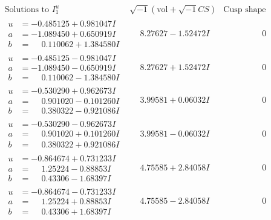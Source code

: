 \documentclass[1p]{elsarticle_modified}
\theoremstyle{definition}
\newcommand{\I}{\sqrt{-1}}
\begin{document}
$$\begin{array}{c|c|c}  
\text{Solutions to }I^u_{1}& \I (\text{vol} + \sqrt{-1}CS) & \text{Cusp shape}\\
 \hline 
\begin{aligned}
u &= -0.485125 + 0.981047 I \\
a &= -1.089450 + 0.650919 I \\
b &= \phantom{-}0.110062 + 1.384580 I\end{aligned}
 & \phantom{-}8.27627 - 1.52472 I & \phantom{-0.000000 } 0 \\ \hline\begin{aligned}
u &= -0.485125 - 0.981047 I \\
a &= -1.089450 - 0.650919 I \\
b &= \phantom{-}0.110062 - 1.384580 I\end{aligned}
 & \phantom{-}8.27627 + 1.52472 I & \phantom{-0.000000 } 0 \\ \hline\begin{aligned}
u &= -0.530290 + 0.962673 I \\
a &= \phantom{-}0.901020 - 0.101260 I \\
b &= \phantom{-}0.380322 - 0.921086 I\end{aligned}
 & \phantom{-}3.99581 + 0.06032 I & \phantom{-0.000000 } 0 \\ \hline\begin{aligned}
u &= -0.530290 - 0.962673 I \\
a &= \phantom{-}0.901020 + 0.101260 I \\
b &= \phantom{-}0.380322 + 0.921086 I\end{aligned}
 & \phantom{-}3.99581 - 0.06032 I & \phantom{-0.000000 } 0 \\ \hline\begin{aligned}
u &= -0.864674 + 0.731233 I \\
a &= \phantom{-}1.25224 - 0.88853 I \\
b &= \phantom{-}0.43306 - 1.68397 I\end{aligned}
 & \phantom{-}4.75585 + 2.84058 I & \phantom{-0.000000 } 0 \\ \hline\begin{aligned}
u &= -0.864674 - 0.731233 I \\
a &= \phantom{-}1.25224 + 0.88853 I \\
b &= \phantom{-}0.43306 + 1.68397 I\end{aligned}
 & \phantom{-}4.75585 - 2.84058 I & \phantom{-0.000000 } 0 \\ \hline\begin{aligned}

\end{aligned}
\end{array}$$
\end{document}
